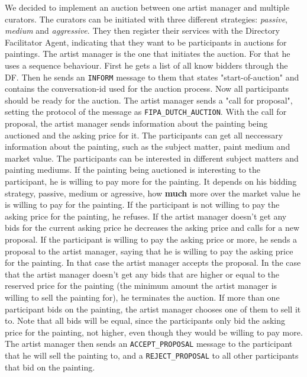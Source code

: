 \documentclass[a4paper, 11pt]{article}
\begin{document}
We decided to implement an auction between one artist manager and multiple curators. The curators can be initiated with three different strategies: \textit{passive}, \textit{medium} and \textit{aggressive}. They then register their services with the Directory Facilitator Agent, indicating that they want to be participants in auctions for paintings. The artist manager is the one that initiates the auction. For that he uses a sequence behaviour. First he gets a list of all know bidders through the DF. Then he sends an \texttt{INFORM} message to them that states "start-of-auction" and contains the conversation-id used for the auction process. Now all participants should be ready for the auction. The artist manager sends a "call for proposal", setting the protocol of the message as \texttt{FIPA\_DUTCH\_AUCTION}. With the call for proposal, the artist manager sends information about the painting being auctioned and the asking price for it. The participants can get all neccessary information about the painting, such as the subject matter, paint medium and market value. The participants can be interested in different subject matters and painting mediums. If the painting being auctioned is interesting to the participant, he is willing to pay more for the painting. It depends on his bidding strategy, passive, medium or agressive, how \textbf{much} more over the market value he is willing to pay for the painting. If the participant is not willing to pay the asking price for the painting, he refuses. If the artist manager doesn't get any bids for the current asking price he decreases the asking price and calls for a new proposal. If the participant is willing to pay the asking price or more, he sends a proposal to the artist manager, saying that he is willing to pay the asking price for the painting. In that case the artist manager accepts the proposal. In the case that the artist manager doesn't get any bids that are higher or equal to the reserved price for the painting (the minimum amount the artist manager is willing to sell the painting for), he terminates the auction. If more than one participant bids on the painting, the artist manager chooses one of them to sell it to. Note that all bids will be equal, since the participants only bid the asking price for the painting, not higher, even though they would be willing to pay more. The artist manager then sends an \texttt{ACCEPT\_PROPOSAL} message to the participant that he will sell the painting to, and a \texttt{REJECT\_PROPOSAL} to all other participants that bid on the painting.
\end{document}
